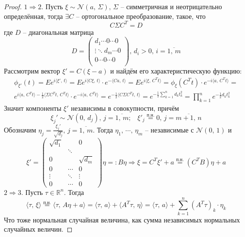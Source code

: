 \begin{proof}
	$1 \Rightarrow 2$. Пусть $\xi \sim \mathcal{N}(a,\, \Sigma),\, \Sigma$ -- симметричная и неотрицательно определённая, тогда $\exists C$ -- ортогональное преобразование, такое, что
	\[C\Sigma C^T = D\]
	где $D$ -- диагональная матрица
	\[
		D =
		\begin{pmatrix}
			d_1 \cdots 0 \cdots 0      \\
			\vdots \ddots d_m \cdots 0 \\
			0 \cdots 0 \cdots 0        \\
		\end{pmatrix},\, d_i > 0,\, i = \overline{1,\,m}
	\]
	Рассмотрим вектор $\xi' = C(\xi - a)$ и найдём его характеристическую функцию:
	\begin{align*}
		\phi_{\xi'}(t) = Ee^{i\langle\xi',\, t\rangle} = Ee^{i\langle C\xi,\,  t\rangle}\cdot e^{-\langle Ca,\,t\rangle} = Ee^{i\langle\xi,\, C^Tt\rangle} = \phi_\xi(C^Tt)\cdot e^{-i\langle a,\, C^Tt\rangle} = \\
		e^{i\langle a,\, C^Tt\rangle - \frac{1}{2}\langle\Sigma C^T t,\, C^T t\rangle}\cdot e^{-i\langle a,\, C^Tt\rangle} = e^{-\frac{1}{2}\langle C\Sigma C^Tt,\, t\rangle} = e^{-\frac{1}{2}\sum_{k = 1}^n d_kt_k^2} = \prod_{k = 1}^n e^{-\frac{1}{2}d_kt_k^2}
	\end{align*}
	Значит компоненты $\xi'$ независимы в совокупности, причём
	\[\xi_j' \sim \mathcal{N}(0,\, d_j),\, j = \overline{1,\,m};\;\;\; \xi'_j \stackrel{\text{п.н.}}{=} 0,\, j = \overline{m + 1,\,n}\]
	Обозначим $\eta_j = \frac{\xi_j'}{\sqrt{d_j}},\, j = \overline{1,\,m}$. Тогда $\eta_1,\,\cdots,\,\eta_m$ -- независимые с $\mathcal{N}(0,\,1)$ и
	\[
		\xi' =
		\begin{pmatrix}
			\sqrt{d_1} &        & 0          \\
			           & \ddots &            \\
			0          &        & \sqrt{d_m} \\
			0          & \cdots & 0          \\
			\vdots     & \ddots & \vdots     \\
			0          & \cdots & 0
		\end{pmatrix}\eta =: B\eta \Rightarrow \xi = C^T\xi' + a \stackrel{\text{п.н.}}{=} (C^TB)\eta + a
	\]
	$2 \Rightarrow 3$. Пусть $\tau \in \mathbb{R}^n$. Тогда
	\[\langle\tau,\, \xi\rangle \stackrel{\text{п.н.}}{=} \langle\tau,\, A\eta + a\rangle = \langle\tau,\, a\rangle + \langle A^T\tau,\, \eta\rangle = \langle\tau,\, a\rangle + \sum_{k = 1}^n (A^T\tau)_k\cdot\eta_k\]
	Что тоже нормальная случайная величина, как сумма независимых нормальных случайных величин.


\end{proof}
